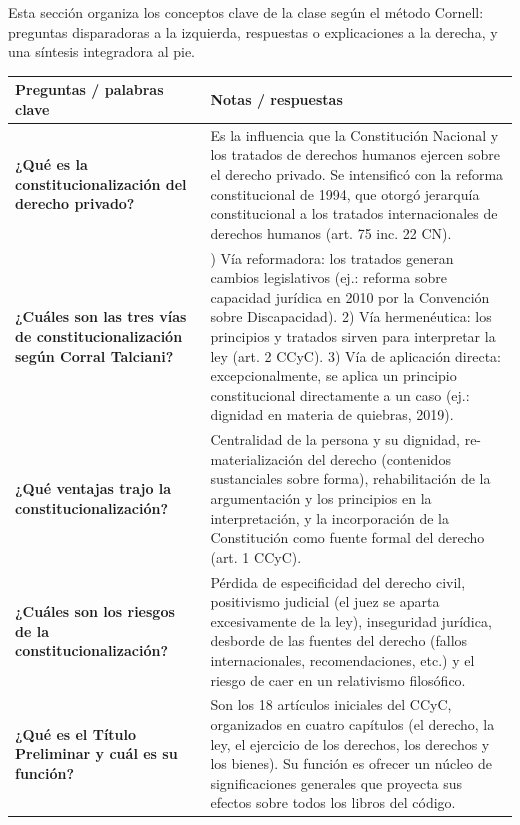 \documentclass[12pt,oneside]{book}
\begin{document}
Esta sección organiza los conceptos clave de la clase según el método Cornell: preguntas disparadoras a la izquierda, respuestas o explicaciones a la derecha, y una síntesis integradora al pie.

\begin{longtable}{
    >{\raggedright\arraybackslash}p{}
    >{\raggedright\arraybackslash}p{}
}
\toprule
\textbf{Preguntas / palabras clave} & \textbf{Notas / respuestas} \\
\midrule
\endhead

\textbf{¿Qué es la constitucionalización del derecho privado?} &
Es la influencia que la Constitución Nacional y los tratados de derechos humanos ejercen sobre el derecho privado. Se intensificó con la reforma constitucional de 1994, que otorgó jerarquía constitucional a los tratados internacionales de derechos humanos (art. 75 inc. 22 CN). \\

\textbf{¿Cuáles son las tres vías de constitucionalización según Corral Talciani?} &
1) Vía reformadora: los tratados generan cambios legislativos (ej.: reforma sobre capacidad jurídica en 2010 por la Convención sobre Discapacidad). 2) Vía hermenéutica: los principios y tratados sirven para interpretar la ley (art. 2 CCyC). 3) Vía de aplicación directa: excepcionalmente, se aplica un principio constitucional directamente a un caso (ej.: dignidad en materia de quiebras, 2019). \\

\textbf{¿Qué ventajas trajo la constitucionalización?} &
Centralidad de la persona y su dignidad, re-materialización del derecho (contenidos sustanciales sobre forma), rehabilitación de la argumentación y los principios en la interpretación, y la incorporación de la Constitución como fuente formal del derecho (art. 1 CCyC). \\

\textbf{¿Cuáles son los riesgos de la constitucionalización?} &
Pérdida de especificidad del derecho civil, positivismo judicial (el juez se aparta excesivamente de la ley), inseguridad jurídica, desborde de las fuentes del derecho (fallos internacionales, recomendaciones, etc.) y el riesgo de caer en un relativismo filosófico. \\

\textbf{¿Qué es el Título Preliminar y cuál es su función?} &
Son los 18 artículos iniciales del CCyC, organizados en cuatro capítulos (el derecho, la ley, el ejercicio de los derechos, los derechos y los bienes). Su función es ofrecer un núcleo de significaciones generales que proyecta sus efectos sobre todos los libros del código. \\


\end{longtable}
\end{document}
